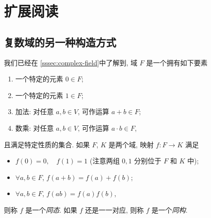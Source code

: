 \newpage
\section{扩展阅读\optional}

\subsection{复数域的另一种构造方式}

我们已经在 \ref{sssec:complex-field}中了解到, 域 $F$ 是一个拥有如下要素
\begin{enumerate}
  \item 一个特定的元素 $0\in F$;
  \item 一个特定的元素 $1\in F$;
  \item 加法: 对任意 $a,b\in V$, 可作运算 $a+b\in F$;
  \item 数乘: 对任意 $a,b\in V$, 可作运算 $a\cdot b\in F$,
\end{enumerate}
且满足特定性质的集合.
如果 $F$, $K$ 是两个域, 映射 $f:F\to K$ 满足
\begin{itemize}
  \item $f(0)=0,\quad f(1)=1$ (注意两组 $0,1$ 分别位于 $F$ 和 $K$ 中);
  \item $\forall a,b\in F$, $f(a+b)=f(a)+f(b)$;
  \item $\forall a,b\in F$, $f(ab)=f(a)f(b)$,
\end{itemize}
则称 $f$ 是一个\emph{同态}.
如果 $f$ 还是一一对应, 则称 $f$ 是一个\emph{同构}.

